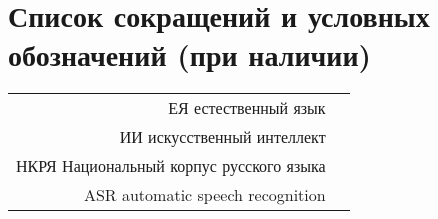 \chapter*{Список сокращений и условных обозначений (при наличии)} %
\noindent
\begin{longtabu} to \textwidth {r X}
ЕЯ естественный язык\\
ИИ искусственный интеллект\\
НКРЯ Национальный корпус русского языка\\
ASR automatic speech recognition
\end{longtabu}
\addtocounter{table}{-1}%
